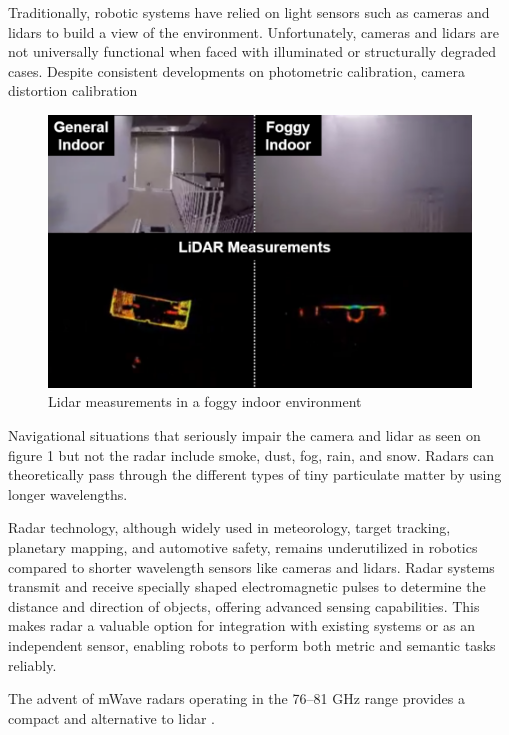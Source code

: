 Traditionally, robotic systems have relied on light sensors such as cameras and lidars to build a view of the environment. Unfortunately, cameras and lidars are not universally functional when faced with illuminated or structurally degraded cases. Despite consistent developments on photometric calibration\citep{PointLightYang}, camera distortion calibration \citep{Jin2019} 

\begin{figure}[H]
    \centering
    \includegraphics[width=\linewidth]{Src/images/x1.png} 
    \caption{Lidar measurements in a foggy indoor environment \citep{harlow2021mmwave}}
    \label{fig:lidarfogy}
\end{figure}
 
Navigational situations that seriously impair the camera \citep{starr2013navigation} and lidar \citep{radio1943detection} as seen on figure 1 but not the radar include smoke, dust, fog, rain, and snow. Radars can theoretically pass through the different types of tiny particulate matter by using longer wavelengths. 

Radar technology, although widely used in meteorology, target tracking, planetary mapping, and automotive safety, remains underutilized in robotics compared to shorter wavelength sensors like cameras and lidars. Radar systems transmit and receive specially shaped electromagnetic pulses to determine the distance and direction of objects, offering advanced sensing capabilities. This makes radar a valuable option for integration with existing systems or as an independent sensor, enabling robots to perform both metric and semantic tasks reliably.

The advent of mWave radars operating in the 76–81 GHz range provides a compact and alternative to lidar . 

